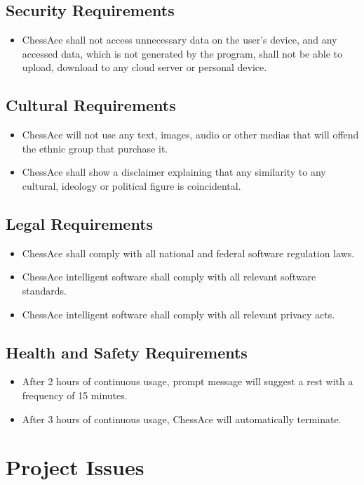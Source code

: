 \documentclass[12pt, titlepage]{article}
\begin{document}
\subsection{Security Requirements}
\begin{itemize}
\item ChessAce shall not access unnecessary data on the user's device, and any accessed data, which is not generated by the program, shall not be able to upload, download to any cloud server or personal device.
\end{itemize}
\subsection{Cultural Requirements}
\begin{itemize}
\item ChessAce will not use any text, images, audio or other medias that will offend the ethnic group that purchase it.
\item ChessAce shall show a disclaimer explaining that any similarity to any cultural, ideology or political figure is coincidental.
\end{itemize}
\subsection{Legal Requirements}
\begin{itemize}
\item ChessAce shall comply with all national and federal software regulation laws.
\item ChessAce intelligent software shall comply with all relevant software standards.
\item ChessAce intelligent software shall comply with all relevant privacy acts.
\end{itemize}
\subsection{Health and Safety Requirements}
\begin{itemize}
\item After 2 hours of continuous usage, prompt message will suggest a rest with a frequency of 15 minutes.
\item After 3 hours of continuous usage, ChessAce will automatically terminate.
\end{itemize}

\section{Project Issues}
\end{document}
